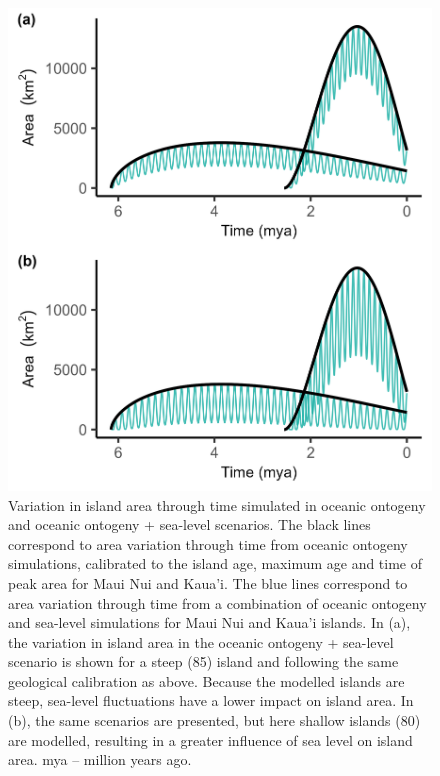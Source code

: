 \documentclass{article}
\begin{document}
\begin{figure}
    \centering
    \includegraphics{JBI-21-0508_Fig1.png}
    \caption{Variation in island area through time simulated in oceanic ontogeny and oceanic ontogeny + sea-level scenarios. The black lines correspond to area variation through time from oceanic ontogeny simulations, calibrated to the island age, maximum age and time of peak area for Maui Nui and Kaua'i. The blue lines correspond to area variation through time from a combination of oceanic ontogeny and sea-level simulations for Maui Nui and Kaua'i islands. In (a), the variation in island area in the oceanic ontogeny + sea-level scenario is shown for a steep (85\degree) island and following the same geological calibration as above. Because the modelled islands are steep, sea-level fluctuations have a lower impact on island area. In (b), the same scenarios are presented, but here shallow islands (80\degree) are modelled, resulting in a greater influence of sea level on island area. mya – million years ago.}
    \label{fig:area}
\end{figure}

\clearpage
\end{document}
